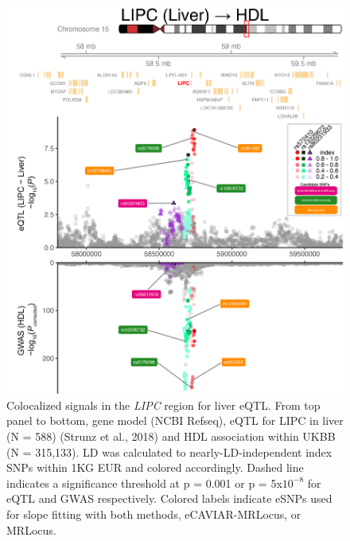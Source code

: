 \documentclass[11pt]{article}
\begin{document}
\begin{figure}[!ht]
  \centering
  \includegraphics[width=.7\textwidth]{figs/region/regionplot.LIPC_Liver_HDL_UKBB.20210114.edit.png}
  \caption{Colocalized signals in the \emph{LIPC} region for liver
    eQTL. From top panel to bottom, gene model (NCBI Refseq), eQTL for
    LIPC in liver (N = 588) (Strunz et al., 2018) and HDL association
    within UKBB (N = 315,133). LD was calculated to
    nearly-LD-independent index SNPs within 1KG EUR and colored
    accordingly. Dashed line indicates a significance threshold at p =
    0.001 or p = 5x$10^{-8}$ for eQTL and GWAS respectively.
    Colored labels indicate eSNPs used for slope fitting with both
    methods, eCAVIAR-MRLocus, or MRLocus.}
\end{figure}
\end{document}
